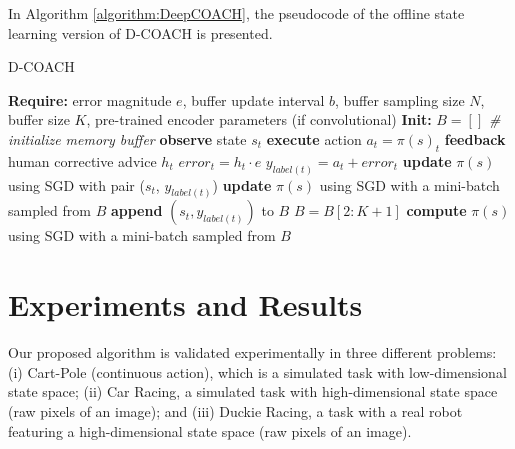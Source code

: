 In Algorithm \ref{algorithm:DeepCOACH}, the pseudocode of the offline state learning version of D-COACH is presented.

\begin{algorithm}[t]
\caption{D-COACH }\label{algorithm:DeepCOACH}
\begin{algorithmic}[1]
\State \textbf{Require:} error magnitude $e$, buffer update interval $b$, buffer sampling size $N$, buffer size $K$, pre-trained encoder parameters (if convolutional) 
\State \textbf{Init:} $B = []$  \emph{\# initialize memory buffer}
\State \textbf{observe} state $s_{t}$
\State \textbf{execute} action $a_{t}=\pi(s)_{t}$
\State \textbf{feedback} human corrective advice $h_{t}$
\State $\mathit{error}_{t} = h_{t}\cdot e$
\State $y_{label(t)} = a_{t} + \mathit{error}_{t}$ 
\State \textbf{update} $\pi(s)$ using SGD with pair ($s_{t}$, $y_{\mathit{label}(t)}$) 
\State \textbf{update} $\pi(s)$ using SGD with a mini-batch sampled from $B$
\State \textbf{append} $(s_{t}, y_{\mathit{label}(t)})$ to $B$
\State $B = B[2:K+1]$
\EndIf
\EndIf
{}
\State \textbf{compute} $\pi(s)$ using SGD with a mini-batch sampled from $B$
\EndIf
\EndFor
\end{algorithmic}
\end{algorithm}

\section{Experiments and Results}
Our proposed algorithm is validated experimentally in three different problems: (i) Cart-Pole (continuous action), which is a simulated task with low-dimensional state space; (ii) Car Racing, a simulated task with high-dimensional state space (raw pixels of an image); and (iii) Duckie Racing, a task with a real robot featuring a high-dimensional state space (raw pixels of an image). 


